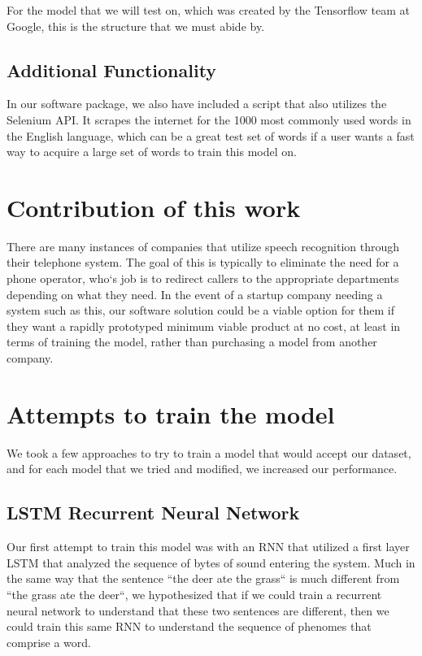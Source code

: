\documentclass[12pt,journal,compsoc]{IEEEtran}
\begin{document}
For the model that we will test on, which was created by the Tensorflow team at Google, this is the structure that we must abide by. 

\subsection{Additional Functionality}

In our software package, we also have included a script that also utilizes the Selenium API. It scrapes the internet for the 1000 most commonly used words in the English language, which can be a great test set of words if a user wants a fast way to acquire a large set of words to train this model on. 

\section{Contribution of this work}

There are many instances of companies that utilize speech recognition through their telephone system. The goal of this is typically to eliminate the need for a phone operator, who`s job is to redirect callers to the appropriate departments depending on what they need. In the event of a startup company needing a system such as this, our software solution could be a viable option for them if they want a rapidly prototyped minimum viable product at no cost, at least in terms of training the model, rather than purchasing a model from another company. 

\section{Attempts to train the model}

We took a few approaches to try to train a model that would accept our dataset, and for each model that we tried and modified, we increased our performance. 

\subsection{LSTM Recurrent Neural Network}

Our first attempt to train this model was with an RNN that utilized a first layer LSTM that analyzed the sequence of bytes of sound entering the system. Much in the same way that the sentence ``the deer ate the grass`` is much different from ``the grass ate the deer``, we hypothesized that if we could train a recurrent neural network to understand that these two sentences are different, then we could train this same RNN to understand the sequence of phenomes that comprise a word. 
\end{document}
